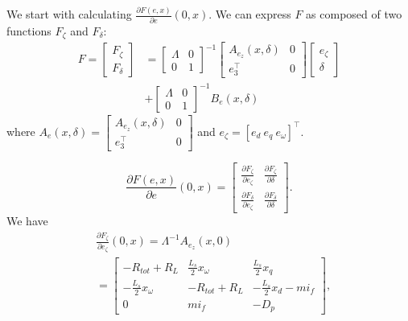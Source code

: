 \documentclass[letterpaper, 10 pt, conference]{ieeeconf}
\begin{document}
We start with calculating $\frac{\partial F(e,x)}{\partial e}(0,x)$. We can express $F$ as composed of two functions $F_\zeta$ and $F_\delta$:
$$
\begin{aligned}
 F = \left[\begin{array}{cc} F_\zeta \\ F_\delta \end{array}\right] &= \left[\begin{array}{cc}
\varLambda & 0\\
0 & 1
\end{array}\right]^{-1} \left[\begin{array}{cc}
A_{e_z}(x,\delta) & 0\\
e_3^\top & 0
\end{array}\right]   \left[\begin{array}{cc} e_\zeta \\ \delta \end{array}\right]    \\ &+ \left[\begin{array}{cc}
\varLambda & 0\\
0 & 1
\end{array}\right]^{-1}B_e\left(x,\delta\right)
\end{aligned}
$$
where $A_e(x,\delta) = \left[\begin{array}{cc}
A_{e_z}(x,\delta) & 0\\
e_3^\top & 0
\end{array}\right] $ and $e_\zeta = \left[e_d \ e_q \ e_\omega \right]^\top$.

$$
\frac{\partial F(e,x)}{\partial e}(0,x)=\left[\begin{array}{cccc}
 \frac{\partial F_\zeta}{\partial e_\zeta} & \frac{\partial F_\zeta}{\partial \delta} \\
\frac{\partial F_\delta}{\partial e_\zeta}  & \frac{\partial F_\delta}{\partial \delta}

\end{array}\right].
$$
We have 
$$
\begin{aligned}
&\frac{\partial F_\zeta}{\partial e_\zeta}(0,x)=\varLambda^{-1}A_{e_z}(x,0) \\&=\left[\begin{array}{ccc}
-R_{tot}+R_{L} & \frac{L_{s}}{2}x_{\omega} & \frac{L_{s}}{2}x_{q} \\
-\frac{L_{s}}{2}x_{\omega} & -R_{tot}+R_{L} & -\frac{L_{s}}{2}x_{d}-mi_f \\
0 & mi_{f} & -D_{p} 
\end{array}\right],
\end{aligned}
$$
\end{document}
